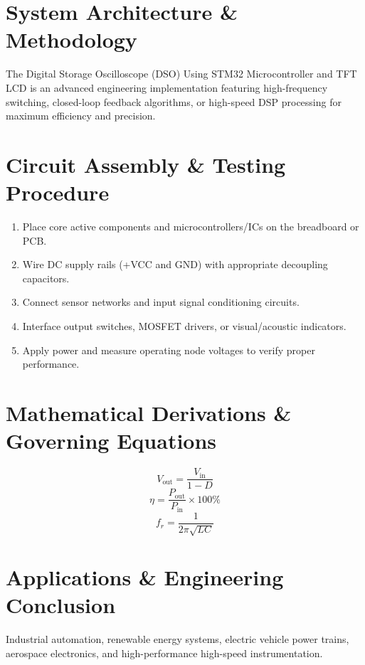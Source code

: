 \documentclass[11pt,a4paper]{article}
\begin{document}
\section{System Architecture \& Methodology}
The Digital Storage Oscilloscope (DSO) Using STM32 Microcontroller and TFT LCD is an advanced engineering implementation featuring high-frequency switching, closed-loop feedback algorithms, or high-speed DSP processing for maximum efficiency and precision.

\section{Circuit Assembly \& Testing Procedure}
\begin{enumerate}
    \item Place core active components and microcontrollers/ICs on the breadboard or PCB.
    \item Wire DC supply rails (+VCC and GND) with appropriate decoupling capacitors.
    \item Connect sensor networks and input signal conditioning circuits.
    \item Interface output switches, MOSFET drivers, or visual/acoustic indicators.
    \item Apply power and measure operating node voltages to verify proper performance.
\end{enumerate}

\section{Mathematical Derivations \& Governing Equations}
\begin{equation}
V_{\text{out}} = \frac{V_{\text{in}}}{1 - D}
\end{equation}
\begin{equation}
\eta = \frac{P_{\text{out}}}{P_{\text{in}}} \times 100\%
\end{equation}
\begin{equation}
f_r = \frac{1}{2\pi \sqrt{L C}}
\end{equation}

\section{Applications \& Engineering Conclusion}
Industrial automation, renewable energy systems, electric vehicle power trains, aerospace electronics, and high-performance high-speed instrumentation.
\end{document}

